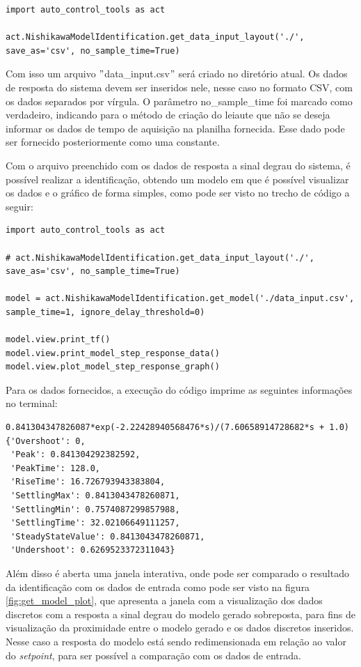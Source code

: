 \begin{lstlisting}[label={lst:get_dil}]
import auto_control_tools as act

act.NishikawaModelIdentification.get_data_input_layout('./', save_as='csv', no_sample_time=True)
\end{lstlisting}

Com isso um arquivo \("\)data\_input.csv\("\) será criado no diretório atual.
Os dados de resposta do sistema devem ser inseridos nele, nesse caso no formato CSV, com os dados separados por vírgula.
O parâmetro no\_sample\_time foi marcado como verdadeiro, indicando para o método de criação do leiaute que não
se deseja informar os dados de tempo de aquisição na planilha fornecida.
Esse dado pode ser fornecido posteriormente como uma constante.

Com o arquivo preenchido com os dados de resposta a sinal degrau do sistema, é possível realizar a identificação,
obtendo um modelo em que é possível visualizar os dados e o gráfico de forma simples, como pode ser visto no trecho
de código a seguir:

\begin{lstlisting}[label={lst:get_model}]
import auto_control_tools as act

# act.NishikawaModelIdentification.get_data_input_layout('./', save_as='csv', no_sample_time=True)

model = act.NishikawaModelIdentification.get_model('./data_input.csv', sample_time=1, ignore_delay_threshold=0)

model.view.print_tf()
model.view.print_model_step_response_data()
model.view.plot_model_step_response_graph()
\end{lstlisting}

Para os dados fornecidos, a execução do código imprime as seguintes informações no terminal:
\begin{lstlisting}[label={lst:get_model_out}]
0.841304347826087*exp(-2.22428940568476*s)/(7.60658914728682*s + 1.0)
{'Overshoot': 0,
 'Peak': 0.841304292382592,
 'PeakTime': 128.0,
 'RiseTime': 16.726793943383804,
 'SettlingMax': 0.8413043478260871,
 'SettlingMin': 0.7574087299857988,
 'SettlingTime': 32.02106649111257,
 'SteadyStateValue': 0.8413043478260871,
 'Undershoot': 0.6269523372311043}
\end{lstlisting}

Além disso é aberta uma janela interativa, onde pode ser comparado o resultado da identificação com os dados de entrada
como pode ser visto na figura \ref{fig:get_model_plot}, que apresenta a janela com a visualização dos dados discretos
com a resposta a sinal degrau do modelo gerado sobreposta, para fins de visualização da proximidade entre o modelo
gerado e os dados discretos inseridos.
Nesse caso a resposta do modelo está sendo redimensionada em relação ao valor do \textit{setpoint}, para ser possível a
comparação com os dados de entrada.

